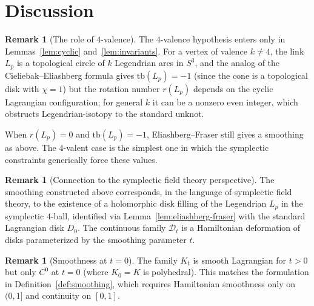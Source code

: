 \documentclass[12pt]{article}
\theoremstyle{definition}
\newtheorem{remark}[theorem]{Remark}
\begin{document}
\section{Discussion}

\begin{remark}[The role of $4$-valence]\label{rmk:4-valent}
The $4$-valence hypothesis enters only in Lemmas~\ref{lem:cyclic} and~\ref{lem:invariants}. For a vertex of valence $k\neq 4$, the link $L_p$ is a topological circle of $k$ Legendrian arcs in $S^3$, and the analog of the Cieliebak--Eliashberg formula gives $\mathrm{tb}(L_p)=-1$ (since the cone is a topological disk with $\chi=1$) but the rotation number $r(L_p)$ depends on the cyclic Lagrangian configuration; for general $k$ it can be a nonzero even integer, which obstructs Legendrian-isotopy to the standard unknot.

When $r(L_p)=0$ and $\mathrm{tb}(L_p)=-1$, Eliashberg--Fraser still gives a smoothing as above. The $4$-valent case is the simplest one in which the symplectic constraints generically force these values.
\end{remark}

\begin{remark}[Connection to the symplectic field theory perspective]\label{rmk:sft}
The smoothing constructed above corresponds, in the language of symplectic field theory, to the existence of a holomorphic disk filling of the Legendrian $L_p$ in the symplectic $4$-ball, identified via Lemma~\ref{lem:eliashberg-fraser} with the standard Lagrangian disk $D_0$. The continuous family $\mathcal{D}_t$ is a Hamiltonian deformation of disks parameterized by the smoothing parameter $t$.
\end{remark}

\begin{remark}[Smoothness at $t=0$]\label{rmk:t0}
The family $K_t$ is smooth Lagrangian for $t>0$ but only $C^0$ at $t=0$ (where $K_0=K$ is polyhedral). This matches the formulation in Definition~\ref{def:smoothing}, which requires Hamiltonian smoothness only on $(0,1]$ and continuity on $[0,1]$.
\end{remark}
\end{document}
